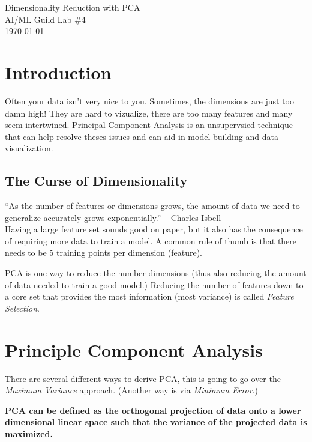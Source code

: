\documentclass[letterpaper,12pt]{article}
\begin{document}
\begin{flushleft}
Dimensionality Reduction with PCA\\
AI/ML Guild Lab \#4\\
\today \\
\end{flushleft}

\section{Introduction}

Often your data isn't very nice to you. Sometimes, the dimensions are just too
damn high! They are hard to vizualize, there are too many features and many seem
intertwined. Principal Component Analysis is an unsupervsied technique that can
help resolve theses issues and can aid in model building and data visualization.

\subsection{The Curse of Dimensionality}

``As the number of features or dimensions grows, the amount of data we need to
generalize accurately grows exponentially.''
-- \href{https://www.cc.gatech.edu/people/charles-isbell}{Charles Isbell} \\

Having a large feature set sounds good on paper, but it also has the consequence of
requiring more data to train a model. A common rule of thumb is that there needs
to be 5 training points per dimension (feature).

PCA is one way to reduce the number dimensions (thus also reducing the amount of
data needed to train a good model.) Reducing the number of features down to a
core set that provides the most information (most variance) is called
\emph{Feature Selection}.

\section{Principle Component Analysis}

There are several different ways to derive PCA, this is going to go over the
\emph{Maximum Variance} approach. (Another way is via \emph{Minimum Error}.)

\textbf{PCA can be defined as the orthogonal projection of data onto a lower dimensional
linear space such that the variance of the projected data is maximized.}
\end{document}
